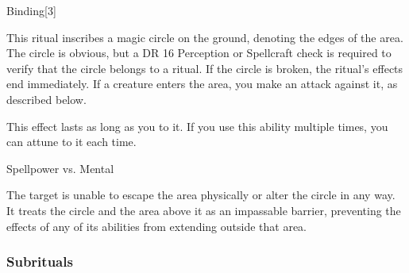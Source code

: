\begin{spellsection}{Binding}[3]

\begin{spellcontent}

\begin{spelltargetinginfo}



\end{spelltargetinginfo}


\begin{spelleffects}



\spelleffect
This ritual inscribes a magic circle on the ground, denoting the edges of the area.
The circle is obvious, but a DR 16 Perception or Spellcraft check is required to verify that the circle belongs to a  ritual.
If the circle is broken, the ritual's effects end immediately.
If a creature enters the area, you make an attack against it, as described below.

This effect lasts as long as you  to it.
If you use this ability multiple times, you can attune to it each time.




\begin{spellattack}{Spellpower vs. Mental}


\spellsuccess
The target is unable to escape the area physically or alter the circle in any way.
It treats the circle and the area above it as an impassable barrier, preventing the effects of any of its abilities from extending outside that area.



\end{spellattack}



\end{spelleffects}

\end{spellcontent}
\begin{spellfooter}


\end{spellfooter}
\begin{spellsubcontent}


\end{spellsubcontent}
\end{spellsection}


\subsubsection{Subrituals}


